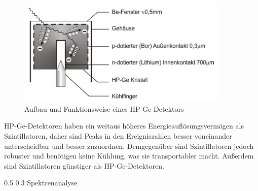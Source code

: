 \documentclass[german, %
parskip=full, %
bibliography=totoc, %
]{scrartcl}
\makeatletter
\renewcommand\subsection{\@startsection 
   {subsection}{2}{0mm}%
   {0.5\baselineskip}%
   {0.3\baselineskip}%
   {\bfseries\sffamily\large}%
   }
\makeatother
\begin{document}
\begin{figure}[ht] 
  \centering
     \includegraphics[width=0.9\textwidth]{HPGeDetektor}
  \caption{Aufbau und Funktionsweise eines HP-Ge-Detektors}
  \label{fig:hpged}
\end{figure}

HP-Ge-Detektoren haben ein weitaus höheres Energieauflösungsvermögen als Szintillatoren, daher sind Peaks in den Ereigniszahlen besser voneinander unterscheidbar und besser zuzuordnen. Demgegenüber sind Szintillatoren jedoch robuster und benötigen keine Kühlung, was sie transportabler macht. Außerdem sind Szintillatoren günstiger als HP-Ge-Detektoren.

\subsection{Spektrenanalyse}
\end{document}
